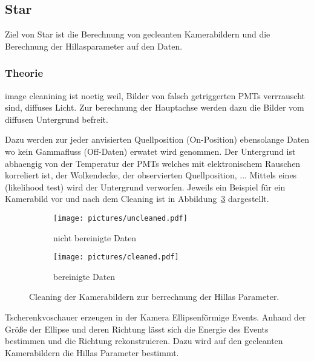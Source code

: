 \subsection{Star}%
\label{sub:star}
Ziel von Star ist die Berechnung von gecleanten Kamerabildern und die Berechnung
der Hillasparameter auf den Daten. 

\subsubsection*{Theorie}
image cleanining ist noetig weil, Bilder von falsch getriggerten PMTs
verrrauscht sind, diffuses Licht. Zur berechnung der Hauptachse werden dazu die
Bilder vom diffusen Untergrund befreit.

Dazu werden zur jeder anvisierten Quellposition (On-Position) ebensolange Daten
wo kein Gammafluss (Off-Daten) erwatet wird genommen.
Der Untergrund ist abhaengig von der Temperatur der PMTs welches mit
elektronischem Rauschen korreliert ist, der Wolkendecke, der observierten
Quellposition, ...
Mittels eines (likelihood test) wird der Untergrund verworfen.
Jeweils ein Beispiel für ein Kamerabild vor und nach dem Cleaning ist in
Abbildung~\ref{fig:cleaning} dargestellt.
\begin{figure}[htpb]
	\centering
	\begin{subfigure}[c]{0.35\linewidth}
		\texttt{[image: pictures/uncleaned.pdf]}
		\caption{nicht bereinigte Daten}
		\label{fig:uncleaned}
	\end{subfigure}
	\begin{subfigure}[c]{0.35\linewidth}
		\texttt{[image: pictures/cleaned.pdf]}
		\caption{bereinigte Daten}
		\label{fig:cleaned}
	\end{subfigure}
	\caption{Cleaning der Kamerabildern zur berrechnung der Hillas Parameter.}
	\label{fig:cleaning}
\end{figure}
Tscherenkvoschauer erzeugen in der Kamera Ellipsenförmige Events. 
Anhand der Größe der Ellipse und deren Richtung lässt sich die Energie des
Events bestimmen und die Richtung rekonstruieren.
Dazu wird auf den gecleanten Kamerabildern die Hillas Parameter bestimmt.


